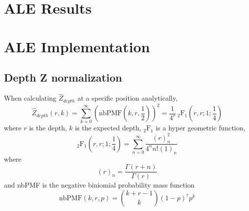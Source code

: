 \documentclass[phd,tocprelim]{cornell}
\begin{document}


\chapter{ALE Results} %
\label{cha:ALE Results}


\chapter{ALE Implementation} %
\label{cha:ALE Implementation}

\section{Depth Z normalization} %
\label{sec:Depth Z normalization}

When calculating $\hat{Z}_{depth}$ at a specific position analytically,
\begin{equation}
    \hat{Z}_{depth}(r,k) = \sum_{k=0}^{\infty} \left(\mbox{nbPMF}\left(k,r,\frac{1}{2}\right)\right)^{2} = \frac{1}{4^{r}} \ _{2}\mbox{F}_{1}\left(r,r;1;\frac{1}{4}\right)
\end{equation}
where $r$ is the depth, $k$ is the expected depth, $_{2}\mbox{F}_{1}$ is a hyper geometric function,
\begin{equation}
    _{2}\mbox{F}_{1}\left(r,r;1;\frac{1}{4}\right) = \sum_{n=0}^{\infty} \frac{(r)^{2}_{n}}{4^{n}n!(1)_{n}}
\end{equation}
where
\begin{equation}
    (r)_{n} = \frac{\Gamma(r+n)}{\Gamma(r)}    
\end{equation}
and nbPMF is the negative biniomial probability mass function
\begin{equation}
    \mbox{nbPMF}\left(k,r,p\right) = {k+r-1 \choose k} (1-p)^{r}p^{k}
\end{equation}
\end{document}
